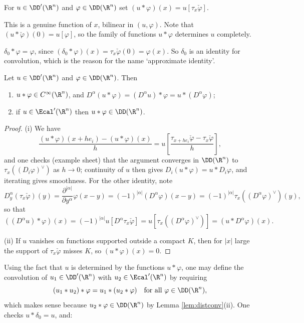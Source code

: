 \begin{definition}
	For $u \in \DD'(\R^n)$ and $\varphi\in\DD(\R^n)$ set $(u*\varphi)(x)=u[\tau_x\check\varphi]$.
\end{definition}

This is a genuine function of $x$, bilinear in $(u,\varphi)$. Note that $(u*\check\varphi)(0)=u[\varphi]$, so the family of functions $u * \varphi$ determines $u$ completely.

\begin{example}
	$\delta_0 * \varphi = \varphi$, since $(\delta_0*\varphi)(x)=\tau_x\check\varphi(0)=\varphi(x)$. So $\delta_0$ is an identity for convolution, which is the reason for the name `approximate identity'.
\end{example}

\begin{lemma}\label{lem:distconv}
	Let $u \in \DD'(\R^n)$ and $\varphi\in\DD(\R^n)$. Then
	\begin{enumerate}[label=(\roman*)]
		\item $u * \varphi\in C^\infty(\R^n)$, and $D^\alpha(u*\varphi)=(D^\alpha u)*\varphi=u*(D^\alpha\varphi)$;
		\item if $u \in \Ecal'(\R^n)$ then $u*\varphi\in\DD(\R^n)$.
	\end{enumerate}
\end{lemma}

\begin{proof}
	(i) We have
	$$\frac{(u*\varphi)(x+he_i)-(u*\varphi)(x)}{h}=u\!\left[\frac{\tau_{x+he_i}\check\varphi-\tau_x\check\varphi}{h}\right],$$
	and one checks (example sheet) that the argument converges in $\DD(\R^n)$ to $\tau_x((D_i\varphi)^\vee)$ as $h \to 0$; continuity of $u$ then gives $D_i(u*\varphi)=u*D_i\varphi$, and iterating gives smoothness. For the other identity, note
	$$D^\alpha_y\left(\tau_x\check\varphi\right)(y)=\frac{\partial^{|\alpha|}}{\partial y^\alpha}\varphi(x-y)=(-1)^{|\alpha|}(D^\alpha\varphi)(x-y)=(-1)^{|\alpha|}\tau_x((D^\alpha\varphi)^\vee)(y),$$
	so that
	$$((D^\alpha u)*\varphi)(x)=(-1)^{|\alpha|}u[D^\alpha\tau_x\check\varphi]=u[\tau_x((D^\alpha\varphi)^\vee)]=(u*D^\alpha\varphi)(x).$$

	(ii) If $u$ vanishes on functions supported outside a compact $K$, then for $|x|$ large the support of $\tau_x\check\varphi$ misses $K$, so $(u*\varphi)(x)=0$.
\end{proof}

Using the fact that $u$ is determined by the functions $u*\varphi$, one may define the convolution of $u_1\in\DD'(\R^n)$ with $u_2\in\Ecal'(\R^n)$ by requiring
$$(u_1*u_2)*\varphi = u_1*(u_2*\varphi) \quad\text{for all }\varphi\in\DD(\R^n),$$
which makes sense because $u_2 * \varphi \in \DD(\R^n)$ by Lemma \ref{lem:distconv}(ii). One checks $u * \delta_0 = u$, and:

